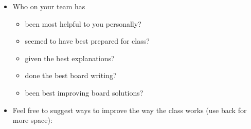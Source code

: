 \documentclass[handout]{mcs}
\begin{document}
\begin{itemize}
\item Who on your team has
  \begin{itemize}
    \item been most helpful to you personally?\hfill\brule{2in}
    \item seemed to have best prepared for class?\hfill\brule{2in}
    \item given the best explanations?\hfill\brule{2in}
    \item done the best board writing?\hfill\brule{2in}
    \item been best improving board solutions?\hfill\brule{2in}
  \end{itemize}

\iffalse

\item Would you like the staff (Meyer/TA/LA) to present solutions to
  selected problems in class after your team has finished working on
  them?

\begin{center}
Never \hspace{0.7in} Rarely \hspace{0.7in} Sometimes \hspace{0.7in}
Regularly \hspace{0.7in} Always
\end{center}
\fi

\item Feel free to suggest ways to improve the way the class works
  (use back for more space):
\vspace{1in}

\end{itemize}
\end{document}
